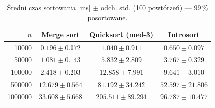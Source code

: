 \begin{table}[H]
\centering
\caption{Średni czas sortowania [ms] $\pm$ odch. std. (100 powtórzeń) — 99\,\% posortowane.}
\label{tab:summary_sorted_99}
\begin{tabular}{rccc}
\toprule
$n$ & Merge sort & Quicksort (med-3) & Introsort \\
\midrule
\num{10000} & $0.196 \pm 0.072$ & $1.040 \pm 0.911$ & $0.650 \pm 0.097$ \\
\num{50000} & $1.081 \pm 0.143$ & $5.832 \pm 2.809$ & $3.767 \pm 0.329$ \\
\num{100000} & $2.418 \pm 0.203$ & $12.858 \pm 7.991$ & $9.641 \pm 3.010$ \\
\num{500000} & $12.679 \pm 0.564$ & $81.192 \pm 34.242$ & $52.597 \pm 21.806$ \\
\num{1000000} & $33.608 \pm 5.668$ & $205.511 \pm 89.294$ & $96.787 \pm 10.477$ \\
\bottomrule
\end{tabular}
\end{table}
